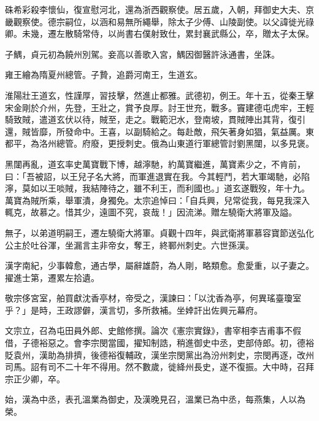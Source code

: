 \begin{pinyinscope}
 硃希彩殺李懷仙，復宣慰河北，還為浙西觀察使。居五歲，入朝，拜御史大夫、京畿觀察使。德宗嗣位，以涵和易無所繩舉，除太子少傅、山陵副使。以父諱徙光祿卿。未幾，遷左散騎常侍，以尚書右僕射致仕，累封襄武縣公，卒，贈太子太保。



 子鰅，貞元初為饒州別駕。妾高以善歌入宮，鰅因御醫許泳通書，坐誅。



 雍王繪為隋夏州總管。子贄，追爵河南王，生道玄。



 淮陽壯王道玄，性謹厚，習技擊，然進止都雅。武德初，例王。年十五，從秦王擊宋金剛於介州，先登，王壯之，賞予良厚。討王世充，戰多。竇建德屯虎牢，王輕騎致賊，遣道玄伏以待，賊至，走之。戰範汜水，登南坡，貫賊陣出其背，復引還，賊皆靡，所發命中。王喜，以副騎給之。每赴敵，飛矢著身如猖，氣益厲。東都平，為洛州總管。府廢，更授刺史。俄為山東道行軍總管討劉黑闥，以多見褒。



 黑闥再亂，道玄率史萬寶戰下博，越濘馳，約萬寶繼進，萬寶素少之，不肯前，曰：「吾被詔，以王兒子名大將，而軍進退實在我。今其輕鬥，若大軍竭馳，必陷濘，莫如以王啖賊，我結陣待之，雖不利王，而利國也。」道玄遂戰歿，年十九。萬寶為賊所乘，舉軍潰，身獨免。太宗追悼曰：「自兵興，兒常從我，每見我深入輒克，故慕之。惜其少，遠圖不究，哀哉！」因流涕。贈左驍衛大將軍及謚。



 無子，以弟道明嗣王，遷左驍衛大將軍。貞觀十四年，與武衛將軍慕容寶節送弘化公主於吐谷渾，坐漏言主非帝女，奪王，終鄆州刺史。六世孫漢。



 漢字南紀，少事韓愈，通古學，屬辭雄蔚，為人剛，略類愈。愈愛重，以子妻之。擢進士第，遷累左拾遺。



 敬宗侈宮室，舶買獻沈香亭材，帝受之，漢諫曰：「以沈香為亭，何異瑤臺瓊室乎？」是時，王政謬僻，漢言切，多所救補。坐婞訐出佐興元幕府。



 文宗立，召為屯田員外郎、史館修撰。論次《憲宗實錄》，書宰相李吉甫事不假借，子德裕惡之。會李宗閔當國，擢知制誥，稍進御史中丞，吏部侍郎。初，德裕貶袁州，漢助為排擠，後德裕復輔政，漢坐宗閔黨出為汾州刺史，宗閔再逐，改州司馬。詔有司不二十年不得用。然不數歲，徙絳州長史，遂不復振。大中時，召拜宗正少卿，卒。



 始，漢為中丞，表孔溫業為御史，及漢晚見召，溫業已為中丞，每燕集，人以為榮。




\end{pinyinscope}
